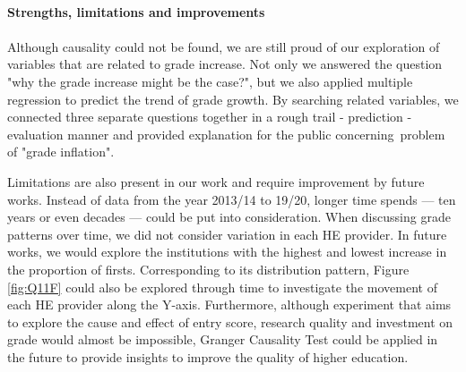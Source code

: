 \documentclass[11pt,a4paper]{article}
\begin{document}
\paragraph{Strengths, limitations and improvements} 
\paragraph{}

Although causality could not be found, we are still proud of our exploration of variables that are related to grade increase. Not only we answered the question "why the grade increase might be the case?", but we also applied multiple regression to predict the trend of grade growth. By searching related variables, we connected three separate questions together in a rough trail - prediction - evaluation manner and provided explanation for the public concerning problem of "grade inflation". 

Limitations are also present in our work and require improvement by future works. Instead of data from the year 2013/14 to 19/20, longer time spends — ten years or even decades — could be put into consideration. When discussing grade patterns over time, we did not consider variation in each HE provider. In future works, we would explore the institutions with the highest and lowest increase in the proportion of firsts. Corresponding to its distribution pattern, Figure \ref{fig:Q11F} could also be explored through time to investigate the movement of each HE provider along the Y-axis. Furthermore, although experiment that aims to explore the cause and effect of entry score, research quality and investment on grade would almost be impossible, Granger Causality Test could be applied in the future to provide insights to improve the quality of higher education. 



\end{document}
